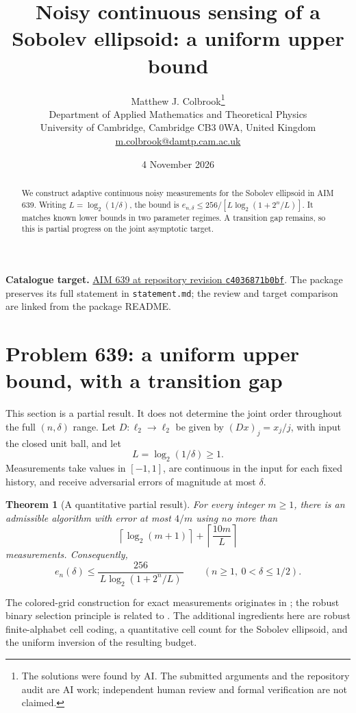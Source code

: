 \documentclass[11pt,a4paper]{article}
\title{Noisy continuous sensing of a Sobolev ellipsoid: a uniform upper bound}
\author{Matthew J. Colbrook\thanks{The solutions were found by AI. The submitted arguments and the repository audit are AI work; independent human review and formal verification are not claimed.}\\[4pt]
\small Department of Applied Mathematics and Theoretical Physics\\
\small University of Cambridge, Cambridge CB3 0WA, United Kingdom\\
\small\href{mailto:m.colbrook@damtp.cam.ac.uk}{m.colbrook@damtp.cam.ac.uk}}
\date{4 November 2026}
\newtheorem{theorem}{Theorem}[section]
\theoremstyle{definition}
\theoremstyle{remark}
\numberwithin{equation}{section}
\begin{document}
\maketitle
\begin{abstract}
We construct adaptive continuous noisy measurements for the Sobolev ellipsoid in AIM 639. Writing $L=\log_2(1/\delta)$, the bound is $e_{n,\delta}\le256/[L\log_2(1+2^n/L)]$. It matches known lower bounds in two parameter regimes. A transition gap remains, so this is partial progress on the joint asymptotic target.
\end{abstract}
\noindent\textbf{Catalogue target.} \href{https://github.com/MColbrook/AIM/blob/c4036871b0bf15cbc83e79c780b7191bcbb2cfed/problems/639-sharp-complexity-of-noisy-continuous-sensing-of-a-sobolev-ellipsoid.md}{AIM 639 at repository revision \texttt{c4036871b0bf}}. The package preserves its full statement in \texttt{statement.md}; the review and target comparison are linked from the package README.
\medskip

\section{Problem 639: a uniform upper bound, with a transition gap}
\label{sec:639}

This section is a partial result. It does not determine the joint order
throughout the full \((n,\delta)\) range.
Let \(D:\ell_2\to\ell_2\) be given by \((Dx)_j=x_j/j\), with input
the closed unit ball, and let
\[
                         L=\log_2(1/\delta)\ge1 .
 \tag{639.1}
\]
Measurements take values in \([-1,1]\), are continuous in the input
for each fixed history, and receive adversarial errors of magnitude
at most \(\delta\).

\begin{theorem}[A quantitative partial result]
\label{thm:639}
For every integer \(m\ge1\), there is an admissible algorithm with
error at most \(4/m\) using no more than
\[
          \left\lceil\log_2(m+1)\right\rceil
                     +\left\lceil\frac{10m}{L}\right\rceil
 \tag{639.2}
\]
measurements. Consequently,
\[
             e_n(\delta)\le
       \frac{256}{\,L\log_2(1+2^n/L)\,}
             \qquad(n\ge1,\ 0<\delta\le1/2).
 \tag{639.3}
\]
\end{theorem}

The colored-grid construction for exact measurements originates in
\cite[Algorithm 2]{knu2024}; the robust binary selection principle is
related to \cite[Theorem 3]{knpw2026}. The additional ingredients here
are robust finite-alphabet cell coding, a quantitative cell count for
the Sobolev ellipsoid, and the uniform inversion of the resulting
budget.
\end{document}
